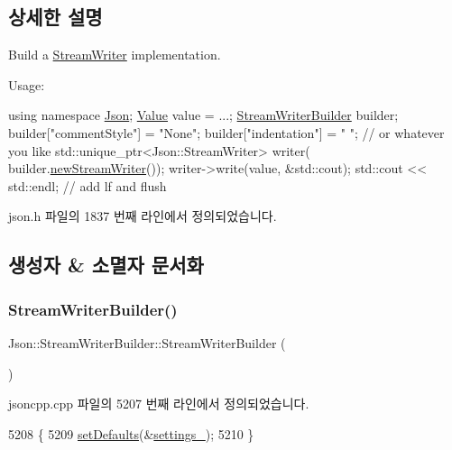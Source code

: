 \subsection{상세한 설명}
Build a \hyperlink{class_json_1_1_stream_writer}{Stream\+Writer} implementation. 

Usage\+: 
\begin{DoxyCode}
\textcolor{keyword}{using namespace }\hyperlink{namespace_json}{Json};
\hyperlink{class_json_1_1_value}{Value} value = ...;
\hyperlink{class_json_1_1_stream_writer_builder}{StreamWriterBuilder} builder;
builder[\textcolor{stringliteral}{"commentStyle"}] = \textcolor{stringliteral}{"None"};
builder[\textcolor{stringliteral}{"indentation"}] = \textcolor{stringliteral}{"   "};  \textcolor{comment}{// or whatever you like}
std::unique\_ptr<Json::StreamWriter> writer(
    builder.\hyperlink{class_json_1_1_stream_writer_builder_ab9ee278609f88ae04a7c1a84e1f559e6}{newStreamWriter}());
writer->write(value, &std::cout);
std::cout << std::endl;  \textcolor{comment}{// add lf and flush}
\end{DoxyCode}
 

json.\+h 파일의 1837 번째 라인에서 정의되었습니다.



\subsection{생성자 \& 소멸자 문서화}
\mbox{\label{class_json_1_1_stream_writer_builder_ab95b76179c152673ad14abc639a46ee4}} 
\subsubsection{\texorpdfstring{Stream\+Writer\+Builder()}{StreamWriterBuilder()}}
{\footnotesize\ttfamily Json\+::\+Stream\+Writer\+Builder\+::\+Stream\+Writer\+Builder (\begin{DoxyParamCaption}{ }\end{DoxyParamCaption})}



jsoncpp.\+cpp 파일의 5207 번째 라인에서 정의되었습니다.


\begin{DoxyCode}
5208 \{
5209   \hyperlink{class_json_1_1_stream_writer_builder_a53bf106b141e28637b01ad0ecd2acbf6}{setDefaults}(&\hyperlink{class_json_1_1_stream_writer_builder_a79bdf2e639a52f4e758c0b95bd1d3423}{settings\_});
5210 \}
\end{DoxyCode}
\mbox{\label{class_json_1_1_stream_writer_builder_a93263f8ef1e2d22593907075d8f0aaef}} 
